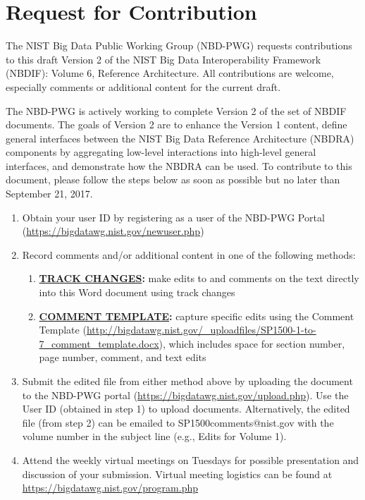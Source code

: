 \section*{\hfill Request for Contribution \hfill}

The NIST Big Data Public Working Group (NBD-PWG) requests
contributions to this draft Version 2 of the NIST Big Data
Interoperability Framework (NBDIF): Volume 6, Reference Architecture.
All contributions are welcome, especially comments or additional
content for the current draft. 

The NBD-PWG is actively working to complete Version 2 of the set of NBDIF documents. The goals of Version 2 are to enhance the Version 1 content, define general interfaces between the NIST Big Data Reference Architecture (NBDRA) components by aggregating low-level interactions into high-level general interfaces, and demonstrate how the NBDRA can be used. 
To contribute to this document, please follow the steps below as soon as possible but no later than September 21, 2017.

\begin{enumerate}

\item	Obtain your user ID by registering as a user of the NBD-PWG
  Portal (\url{https://bigdatawg.nist.gov/newuser.php})

\item	Record comments and/or additional content in one of the
  following methods:

  \begin{enumerate}

  \item {\bf\underline{TRACK CHANGES}:} make edits to and comments on the text
    directly into this Word document using track changes

    \item {\bf\underline{COMMENT TEMPLATE}:} capture specific edits using the Comment
      Template
      (\url{http://bigdatawg.nist.gov/_uploadfiles/SP1500-1-to-7_comment_template.docx}),
      which includes space for section number, page number, comment,
      and text edits

\end{enumerate}

\item Submit the edited file from either method above by uploading the
  document to the NBD-PWG portal
  (\url{https://bigdatawg.nist.gov/upload.php}). Use the User ID
  (obtained in step 1) to upload documents. Alternatively, the edited
  file (from step 2) can be emailed to SP1500comments@nist.gov with
  the volume number in the subject line (e.g., Edits for Volume 1).

\item	Attend the weekly virtual meetings on Tuesdays for possible
  presentation and discussion of your submission. Virtual meeting
  logistics can be found at
  \url{https://bigdatawg.nist.gov/program.php}
\end{enumerate}

